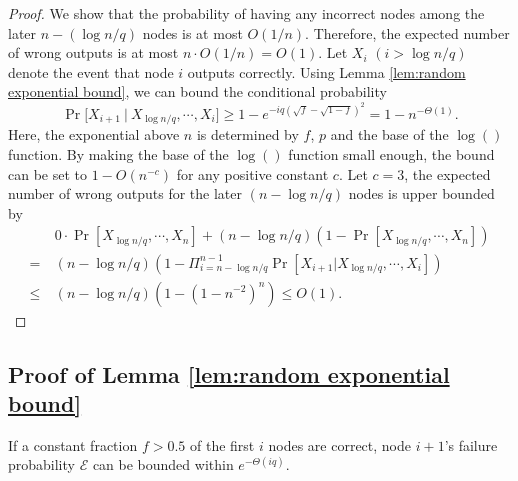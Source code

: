 \documentclass[a4paper,UKenglish]{lipics}
\theoremstyle{definition}
\begin{document}
\begin{proof}
We show that the probability of having any incorrect nodes among the later $n - (\log n/q)$ nodes is at most $O(1/n)$.
Therefore, the expected number of wrong outputs is at most $n\cdot O(1/n) = O(1)$. 
Let $X_i$ $(i > \log n/q)$ denote the event that node $i$ outputs correctly.
Using Lemma \ref{lem:random exponential bound}, we can bound the conditional probability
\begin{equation*}
	\Pr\Big[
		X_{i+1}~\Big|~ X_{\log n/q}, \dotsb, X_{i}
	\Big]
\ge
	1 - e^{-iq(\sqrt{f} - \sqrt{1-f})^2}
=
	1 - n^{-\Theta(1)}.
\end{equation*}
Here, the exponential above $n$ is determined by $f$, $p$ and the base of the $\log()$ function. 
By making the base of the $\log()$ function small enough, the bound can be set to $1 - O(n^{-c})$ for any positive constant $c$.
Let $c = 3$, the expected number of wrong outputs for the later $(n - \log n/q)$ nodes is upper bounded by
\begin{align*}
&
	0\cdot \Pr[X_{\log n/q}, \dotsb, X_n] + (n - \log n/q)(1 - \Pr[X_{\log n/q}, \dotsb, X_n]) \\
=~ & 
	(n - \log n/q)(1 - \Pi_{i = n - \log n/q}^{n-1}\Pr[X_{i+1} | X_{\log n/q}, \dotsb, X_i]) \\
\le~ &
	(n - \log n/q)(1 - (1 - n^{-2})^n)
	\le
	O(1).
\end{align*}
\end{proof}

\subsection{Proof of Lemma \ref{lem:random exponential bound}}
\label{subsec:random exponential bound}

If a constant fraction $f > 0.5$ of the first $i$ nodes are correct, 
	node $i+1$'s failure probability $\mathcal{E}$ can be bounded within $e^{-\Theta(iq)}$. 
\end{document}
